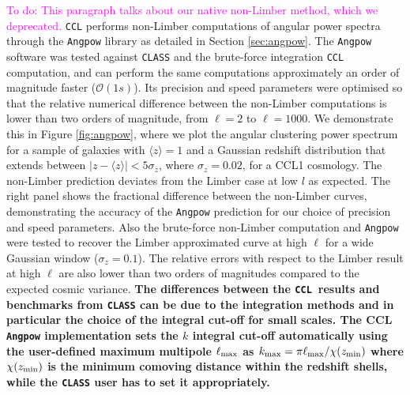 \documentclass[\docopts]{\docclass}
\newcommand{\todo}[1]{\textcolor{magenta}{To do: #1}}
\newcommand{\ccl}{{\tt CCL}\xspace}
\newcommand{\class}{{\tt CLASS}\xspace}
\begin{document}
\todo{This paragraph talks about our native non-Limber method, which we deprecated.}
\ccl performs non-Limber computations of angular power spectra through the {\tt Angpow} library as detailed in Section \ref{sec:angpow}. The \texttt{Angpow} software was tested against \class and the brute-force integration \ccl computation, and can perform the same computations approximately an order of magnitude faster ($\mathcal{O}(1s)$). Its precision and speed parameters were optimised so that the relative numerical difference between the non-Limber computations is lower than two orders of magnitude, from $\ell=2$ to $\ell=1000$. We demonstrate this in Figure \ref{fig:angpow}, where we plot the angular clustering power spectrum for a sample of galaxies with $\langle z \rangle=1$ and a Gaussian redshift distribution that extends between $|z-\langle z \rangle|<5\sigma_z$, where $\sigma_z=0.02$, for a CCL1 cosmology. The non-Limber prediction deviates from the Limber case at low $l$ as expected. The right panel shows the fractional difference between the non-Limber curves, demonstrating the accuracy of the {\tt Angpow} prediction for our choice of precision and speed parameters. Also the brute-force non-Limber computation and {\tt Angpow} were tested to recover the Limber approximated curve at high $\ell$ for a wide Gaussian window ($\sigma_z=0.1$). The relative errors with respect to the Limber result at high $\ell$ are also lower than two orders of magnitudes compared to the expected cosmic variance. {\bf The differences between the \ccl~results and benchmarks from \class can be due to the integration methods and in particular the choice of the integral cut-off for small scales. The CCL {\tt Angpow} implementation sets the $k$ integral cut-off automatically using the user-defined maximum multipole $\ell_{\rm max}$ as $k_{\rm max}=\pi \ell_{\rm max} / \chi(z_{\rm min})$ where $\chi(z_{\rm min})$ is the minimum comoving distance within the redshift shells, while the \class user has to set it appropriately.}
\end{document}
